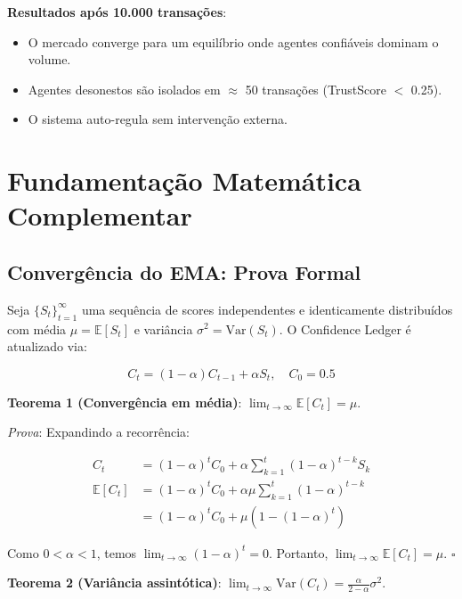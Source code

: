 \textbf{Resultados após 10.000 transações}:
\begin{itemize}
    \item O mercado converge para um equilíbrio onde agentes confiáveis dominam o volume.
    \item Agentes desonestos são isolados em $\approx$ 50 transações (TrustScore $<$ 0.25).
    \item O sistema auto-regula sem intervenção externa.
\end{itemize}

\section{Fundamentação Matemática Complementar}
\label{sec:math-foundations}

\subsection{Convergência do EMA: Prova Formal}

Seja $\{S_t\}_{t=1}^\infty$ uma sequência de scores independentes e identicamente distribuídos com média $\mu = \mathbb{E}[S_t]$ e variância $\sigma^2 = \text{Var}(S_t)$. O Confidence Ledger é atualizado via:

\begin{equation}
C_t = (1 - \alpha) C_{t-1} + \alpha S_t, \quad C_0 = 0.5
\label{eq:ema-recurrence}
\end{equation}

\textbf{Teorema 1 (Convergência em média)}: $\lim_{t \to \infty} \mathbb{E}[C_t] = \mu$.

\textit{Prova}: Expandindo a recorrência:

\begin{align}
C_t &= (1-\alpha)^t C_0 + \alpha \sum_{k=1}^{t} (1-\alpha)^{t-k} S_k \\
\mathbb{E}[C_t] &= (1-\alpha)^t C_0 + \alpha \mu \sum_{k=1}^{t} (1-\alpha)^{t-k} \\
&= (1-\alpha)^t C_0 + \mu (1 - (1-\alpha)^t)
\end{align}

Como $0 < \alpha < 1$, temos $\lim_{t \to \infty} (1-\alpha)^t = 0$. Portanto, $\lim_{t \to \infty} \mathbb{E}[C_t] = \mu$. $\square$

\textbf{Teorema 2 (Variância assintótica)}: $\lim_{t \to \infty} \text{Var}(C_t) = \frac{\alpha}{2-\alpha} \sigma^2$.

